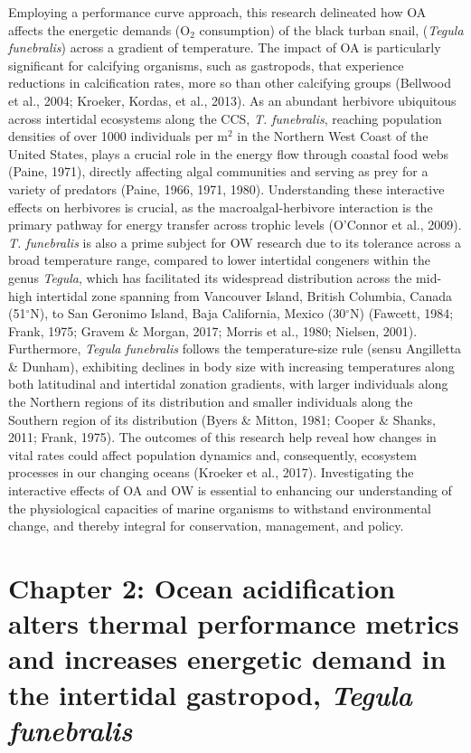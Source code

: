 \documentclass{CSUNthesis}
\begin{document}
Employing a performance curve approach, this research delineated how OA affects the energetic demands (O\(_2\) consumption) of the black turban snail, (\textit{Tegula funebralis}) across a gradient of temperature. The impact of OA is particularly significant for calcifying organisms, such as gastropods, that experience reductions in calcification rates, more so than other calcifying groups (Bellwood et al., 2004; Kroeker, Kordas, et al., 2013). As an abundant herbivore ubiquitous across intertidal ecosystems along the CCS, \textit{T. funebralis}, reaching population densities of over 1000 individuals per m\(^{2}\) in the Northern West Coast of the United States, plays a crucial role in the energy flow through coastal food webs (Paine, 1971), directly affecting algal communities and serving as prey for a variety of predators (Paine, 1966, 1971, 1980). Understanding these interactive effects on herbivores is crucial, as the macroalgal-herbivore interaction is the primary pathway for energy transfer across trophic levels (O'Connor et al., 2009). \textit{T. funebralis} is also a prime subject for OW research due to its tolerance across a broad temperature range, compared to lower intertidal congeners within the genus \textit{Tegula}, which has facilitated its widespread distribution across the mid-high intertidal zone spanning from Vancouver Island, British Columbia, Canada (51\(^\circ\)N), to San Geronimo Island, Baja California, Mexico (30\(^\circ\)N) (Fawcett, 1984; Frank, 1975; Gravem \& Morgan, 2017; Morris et al., 1980; Nielsen, 2001). Furthermore, \textit{Tegula funebralis} follows the temperature-size rule (sensu Angilletta \& Dunham), exhibiting declines in body size with increasing temperatures along both latitudinal and intertidal zonation gradients, with larger individuals along the Northern regions of its distribution and smaller individuals along the Southern region of its distribution (Byers \& Mitton, 1981; Cooper \& Shanks, 2011; Frank, 1975). The outcomes of this research help reveal how changes in vital rates could affect population dynamics and, consequently, ecosystem processes in our changing oceans (Kroeker et al., 2017). Investigating the interactive effects of OA and OW is essential to enhancing our understanding of the physiological capacities of marine organisms to withstand environmental change, and thereby integral for conservation, management, and policy.

\chapter*{\texorpdfstring{Chapter 2: Ocean acidification alters thermal performance metrics and increases energetic demand in the intertidal gastropod, \textit{Tegula funebralis}}{Chapter 2: Ocean acidification alters thermal performance metrics and increases energetic demand in the intertidal gastropod, }}\label{chapter-2-ocean-acidification-alters-thermal-performance-metrics-and-increases-energetic-demand-in-the-intertidal-gastropod}
\end{document}
